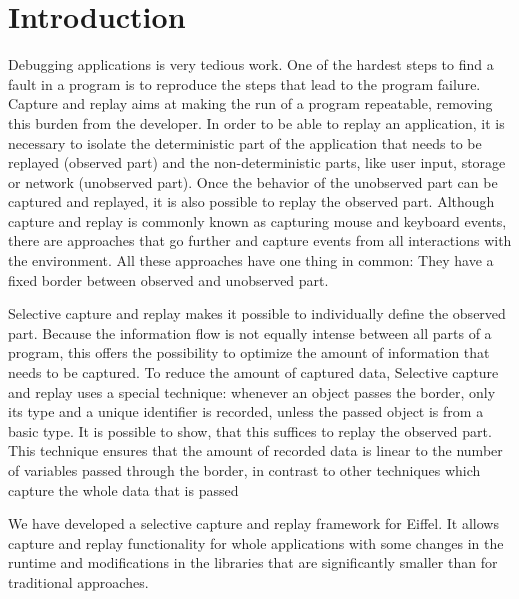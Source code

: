 \chapter{Introduction}
Debugging applications is very tedious work. One of the hardest steps to find a fault in a program is to reproduce the steps that lead to the program failure. Capture and replay aims at making the run of a program repeatable, removing this burden from the developer. In order to be able to replay an application, it is necessary to isolate the deterministic part of the application that needs to be replayed (observed part) and the non-deterministic parts, like user input, storage or network (unobserved part). Once the behavior of the unobserved part can be captured and replayed, it is also possible to replay the observed part. Although capture and replay is commonly known as capturing mouse and keyboard events, there are approaches that go further and capture events from all interactions with the environment. All these approaches have one thing in common: They have a fixed border between observed and unobserved part.

Selective capture and replay \cite{orso05may} makes it possible to individually define the observed part. Because the information flow is not equally intense between all parts of a program, this offers the possibility to optimize the amount of information that needs to be captured. To reduce the amount of captured data, Selective capture and replay uses a special technique: whenever an object passes the border, only its type and a unique identifier is recorded, unless the passed object is from a basic type. It is possible to show, that this suffices to replay the observed part. This technique ensures that the amount of recorded data is linear to the number of variables passed through the border, in contrast to other techniques which capture the whole data that is passed

We have developed a selective capture and replay framework for Eiffel. It allows capture and replay functionality for whole applications with some changes in the runtime and modifications in the libraries that are significantly smaller than for traditional approaches.

